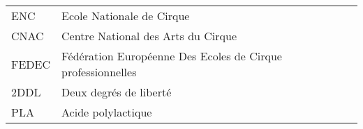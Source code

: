 \chapter*{\abbrevname}
\pagestyle{pagenumber}
%
\begin{acronym}
\end{acronym}
%
\begin{longtable}{lp{5in}}
ENC       & Ecole Nationale de Cirque\\
CNAC       & Centre National des Arts du Cirque\\
FEDEC       & Fédération Européenne Des Ecoles de Cirque professionnelles\\
2DDL       & Deux degrés de liberté\\
PLA       & Acide polylactique\\
\end{longtable}

